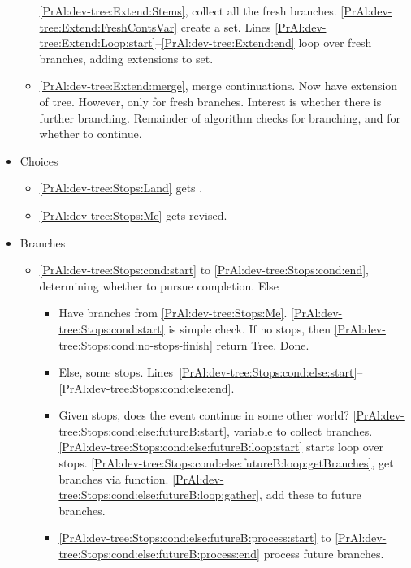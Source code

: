 \begin{note}
\begin{itemize}
\begin{itemize}
      \autoref{PrAl:dev-tree:Extend:Stems}, collect all the fresh branches.
      \autoref{PrAl:dev-tree:Extend:FreshContsVar} create a set.
      Lines \ref{PrAl:dev-tree:Extend:Loop:start}--\ref{PrAl:dev-tree:Extend:end} loop over fresh branches, adding extensions to set.
    \item
      \autoref{PrAl:dev-tree:Extend:merge}, merge continuations.
      Now have extension of tree.
      However, only for fresh branches.
      Interest is whether there is further branching.
      Remainder of algorithm checks for branching, and for whether to continue.
    \end{itemize}
  \item Choices
    \begin{itemize}
    \item
      \autoref{PrAl:dev-tree:Stops:Land} gets \citeauthor{Landman:1992wh}.
    \item
      \autoref{PrAl:dev-tree:Stops:Me} gets revised.
    \end{itemize}
  \item Branches
    \begin{itemize}
    \item
      \autoref{PrAl:dev-tree:Stops:cond:start} to \autoref{PrAl:dev-tree:Stops:cond:end}, determining whether to pursue completion.
      Else 
      \begin{itemize}
      \item
        Have branches from \autoref{PrAl:dev-tree:Stops:Me}.
        \autoref{PrAl:dev-tree:Stops:cond:start} is simple check.
        If no stops, then \autoref{PrAl:dev-tree:Stops:cond:no-stops-finish} return Tree.
        Done.
      \item
        Else, some stops.
        Lines~\ref{PrAl:dev-tree:Stops:cond:else:start}--\ref{PrAl:dev-tree:Stops:cond:else:end}.
      \item
        Given stops, does the event continue in some other world?
        \autoref{PrAl:dev-tree:Stops:cond:else:futureB:start}, variable to collect branches.
        \autoref{PrAl:dev-tree:Stops:cond:else:futureB:loop:start} starts loop over stops.
        \autoref{PrAl:dev-tree:Stops:cond:else:futureB:loop:getBranches}, get branches via function.
        \autoref{PrAl:dev-tree:Stops:cond:else:futureB:loop:gather}, add these to future branches.
      \item
        \autoref{PrAl:dev-tree:Stops:cond:else:futureB:process:start} to \autoref{PrAl:dev-tree:Stops:cond:else:futureB:process:end} process future branches.

\end{itemize}
\end{itemize}
\end{itemize}
\end{note}
